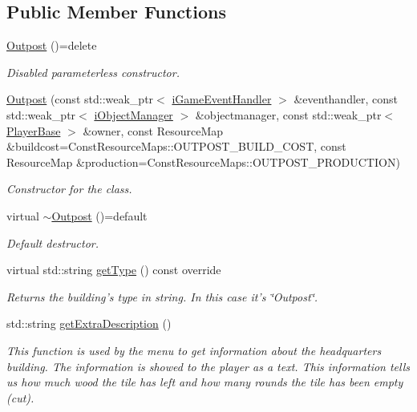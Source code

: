 \subsection*{Public Member Functions}
\begin{DoxyCompactItemize}
\item 
\hypertarget{class_course_1_1_outpost_a3b69759306e036223cfd991337c8b4e2}{\hyperlink{class_course_1_1_outpost_a3b69759306e036223cfd991337c8b4e2}{Outpost} ()=delete}\label{class_course_1_1_outpost_a3b69759306e036223cfd991337c8b4e2}

\begin{DoxyCompactList}\small\item\em Disabled parameterless constructor. \end{DoxyCompactList}\item 
\hyperlink{class_course_1_1_outpost_a2447a5968b4f7dd2faceacd50b804f71}{Outpost} (const std\-::weak\-\_\-ptr$<$ \hyperlink{class_course_1_1i_game_event_handler}{i\-Game\-Event\-Handler} $>$ \&eventhandler, const std\-::weak\-\_\-ptr$<$ \hyperlink{class_course_1_1i_object_manager}{i\-Object\-Manager} $>$ \&objectmanager, const std\-::weak\-\_\-ptr$<$ \hyperlink{class_course_1_1_player_base}{Player\-Base} $>$ \&owner, const Resource\-Map \&buildcost=Const\-Resource\-Maps\-::\-O\-U\-T\-P\-O\-S\-T\-\_\-\-B\-U\-I\-L\-D\-\_\-\-C\-O\-S\-T, const Resource\-Map \&production=Const\-Resource\-Maps\-::\-O\-U\-T\-P\-O\-S\-T\-\_\-\-P\-R\-O\-D\-U\-C\-T\-I\-O\-N)
\begin{DoxyCompactList}\small\item\em Constructor for the class. \end{DoxyCompactList}\item 
\hypertarget{class_course_1_1_outpost_aed6c03ab76797cac0712b1d88660ce14}{virtual \hyperlink{class_course_1_1_outpost_aed6c03ab76797cac0712b1d88660ce14}{$\sim$\-Outpost} ()=default}\label{class_course_1_1_outpost_aed6c03ab76797cac0712b1d88660ce14}

\begin{DoxyCompactList}\small\item\em Default destructor. \end{DoxyCompactList}\item 
virtual std\-::string \hyperlink{class_course_1_1_outpost_a8c89c67187451e0a49ecd57d4fc80602}{get\-Type} () const override
\begin{DoxyCompactList}\small\item\em Returns the building's type in string. In this case it's \char`\"{}\-Outpost\char`\"{}. \end{DoxyCompactList}\item 
std\-::string \hyperlink{class_course_1_1_outpost_a2019a87ccf9a85aa6e01c9217c644473}{get\-Extra\-Description} ()
\begin{DoxyCompactList}\small\item\em This function is used by the menu to get information about the headquarters building. The information is showed to the player as a text. This information tells us how much wood the tile has left and how many rounds the tile has been empty (cut). \end{DoxyCompactList}\end{DoxyCompactItemize}
